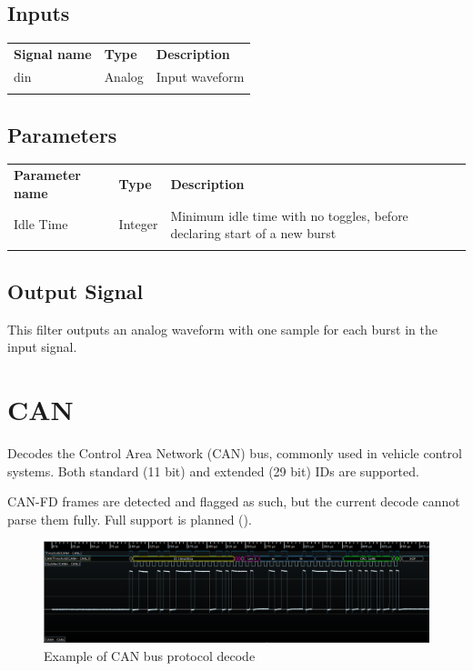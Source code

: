 \subsection{Inputs}

\begin{tabularx}{16cm}{llX}
\thickhline
\textbf{Signal name} & \textbf{Type} & \textbf{Description} \\
\thickhline
din & Analog & Input waveform \\
\thickhline
\end{tabularx}

\subsection{Parameters}

\begin{tabularx}{16cm}{llX}
\thickhline
\textbf{Parameter name} & \textbf{Type} & \textbf{Description} \\
\thickhline
Idle Time & Integer & Minimum idle time with no toggles, before declaring start of a new burst\\
\thickhline
\end{tabularx}

\subsection{Output Signal}

This filter outputs an analog waveform with one sample for each burst in the input signal.

\pagebreak
\section{CAN}
\label{filter:can}

Decodes the Control Area Network (CAN) bus, commonly used in vehicle control systems. Both standard (11 bit) and
extended (29 bit) IDs are supported.

CAN-FD frames are detected and flagged as such, but the current decode cannot parse them fully. Full support is planned
().

\begin{figure}[h]
\centering
\includegraphics[width=16cm]{images/filters/can.png}
\caption{Example of CAN bus protocol decode}
\label{filter_can}
\end{figure}

